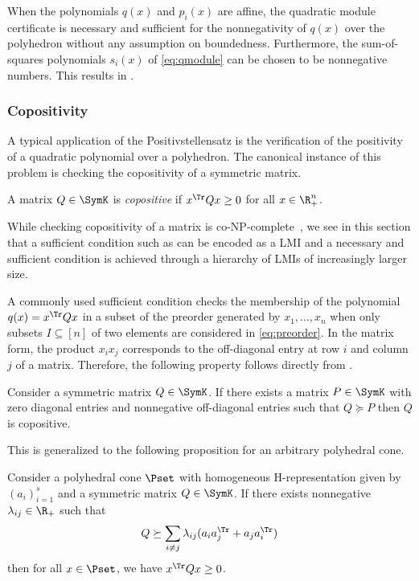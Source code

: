 \documentclass[11pt,twoside,a4paper,openright]{uclouvain-thesis}
\newcommand{\ineqnum}{s}
\begin{document}
When the polynomials $q(x)$ and $p_i(x)$ are affine, the quadratic module certificate
is necessary and sufficient for the nonnegativity of $q(x)$ over the polyhedron
without any assumption on boundedness. Furthermore, the sum-of-squares polynomials
$s_i(x)$ of \eqref{eq:qmodule} can be chosen to be nonnegative numbers.
This results in .

\subsubsection{Copositivity}

A typical application of the Positivstellensatz is the verification of
the positivity of a quadratic polynomial over a polyhedron.
The canonical instance of this problem is checking the copositivity of a symmetric matrix.
\begin{mydef}[Copositivity]
  A matrix $Q \in \SymK$ is \emph{copositive} if
  $x^\Tr Q x \ge 0$ for all $x \in \R^n_+$.
\end{mydef}

While checking copositivity of a matrix is co-NP-complete~\cite{murty1987some},
we see in this section that a sufficient condition such as  can be encoded as a LMI
and a necessary and sufficient condition is achieved through a hierarchy of LMIs of increasingly larger size.

A commonly used sufficient condition checks the membership of the polynomial
$q(x) = x^\Tr Q x$ in a subset of the preorder generated by $x_1, \ldots, x_n$
when only subsets $I \subseteq [n]$ of two elements are considered in \eqref{eq:preorder}.
In the matrix form, the product $x_ix_j$ corresponds to the off-diagonal entry at row $i$ and column $j$ of a matrix.
Therefore, the following property follows directly from .
\begin{myprop}
  \label{prop:copos}
  Consider a symmetric matrix $Q \in \SymK$.
  If there exists a matrix $P \in \SymK$ with zero diagonal entries
  and nonnegative off-diagonal entries such that $Q \succeq P$ then
  $Q$ is copositive.
\end{myprop}

This is generalized to the following proposition for an arbitrary polyhedral cone.

\begin{myprop}
  \label{prop:conepos}
  Consider a polyhedral cone $\Pset$ with homogeneous H-representation
  given by $(a_i)_{i=1}^\ineqnum$
  and a symmetric matrix $Q \in \SymK$.
  If there exists nonnegative $\lambda_{ij} \in \R_+$ such that
  \[ Q \succeq \sum_{i \neq j} \lambda_{ij} (a_ia_j^\Tr + a_ja_i^\Tr) \]
  then for all $x \in \Pset$, we have $x^\Tr Q x \ge 0$.
\end{myprop}
\end{document}
